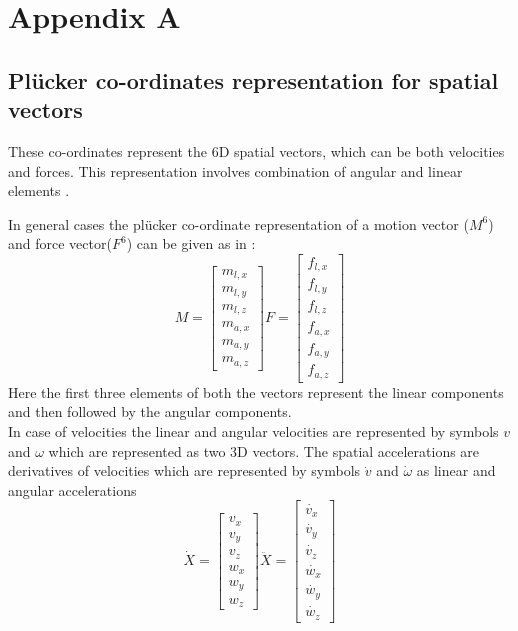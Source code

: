 
\chapter{Appendix A}
\section{Pl\"ucker co-ordinates representation for spatial vectors}
\label{plucker}
These co-ordinates represent the 6D spatial vectors, which can be both velocities and forces. This representation involves combination of angular and linear elements \cite{featherstone2014rigid}.
\par 
In general cases the pl\"ucker co-ordinate representation of a motion vector ($M^6$) and force vector($F^6$) can be given as in \cite{featherstone2014rigid}:
\[
M =
\begin{bmatrix}
m_{l,x} \\ m_{l,y}\\ m_{l,z} \\ m_{a,x} \\ m_{a,y} \\ m_{a,z}
\end{bmatrix}
F =
\begin{bmatrix}
f_{l,x} \\ f_{l,y}\\ f_{l,z} \\ f_{a,x} \\ f_{a,y} \\ f_{a,z}
\end{bmatrix}
\]
Here the first three elements of both the vectors represent the linear components and then followed by the angular components.\\
In case of velocities the linear and angular velocities are represented by symbols $v$ and $\omega$ which are represented as two 3D vectors. The spatial accelerations are derivatives of velocities which are represented by symbols $\dot{v}$ and $\dot{\omega}$ as linear and angular accelerations
\[ \dot{X} =
\begin{bmatrix}
v_x \\ v_y\\ v_z \\ w_x \\ w_y \\ w_z
\end{bmatrix} 
 \ddot{X} =
\begin{bmatrix}
\dot{v_x} \\ \dot{v_y}\\ \dot{v_z} \\ \dot{w_x} \\ \dot{w_y} \\ \dot{w_z}
\end{bmatrix} \]
